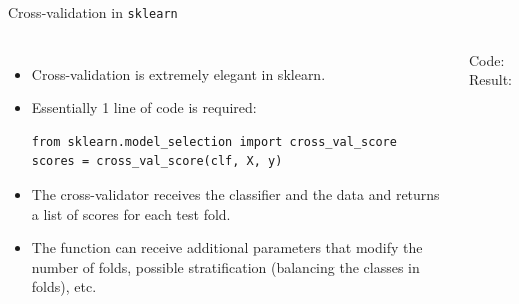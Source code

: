 \documentclass[10pt, aspectratio=169]{beamer} %
\begin{document}
\begin{frame}[fragile]{Cross-validation in \texttt{sklearn}}
\begin{columns}
{\small\vspace*{-0.8cm}
\begin{itemize}
\item Cross-validation is extremely elegant in sklearn.
\item Essentially 1 line of code is required:
\begin{verbatim}
from sklearn.model_selection import cross_val_score
scores = cross_val_score(clf, X, y)
\end{verbatim}
\item The cross-validator receives the classifier and the data and
returns a list of scores for each test fold.
\item The function can receive additional parameters that modify the 
number of folds, possible stratification (balancing the classes in folds), etc.
\end{itemize}
}
{\scriptsize Code:}\\
{\scriptsize Result:}\\
\end{columns}
\end{frame}
\end{document}
